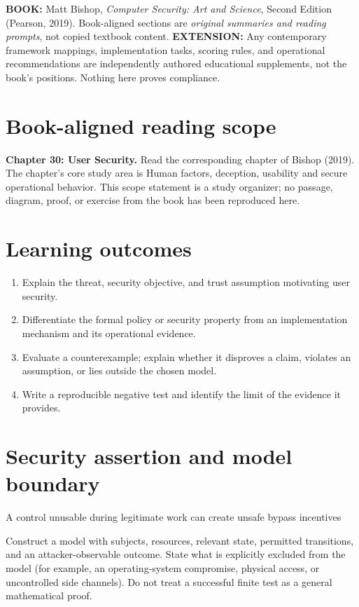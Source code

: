 \documentclass[10pt,letterpaper]{article}
\begin{document}
\makedoctocpage
\begin{notebox}
\textbf{BOOK:} Matt Bishop, \emph{Computer Security: Art and Science}, Second Edition (Pearson, 2019). Book-aligned sections are \emph{original summaries and reading prompts}, not copied textbook content.
\textbf{EXTENSION:} Any contemporary framework mappings, implementation tasks, scoring rules, and operational recommendations are independently authored educational supplements, not the book's positions. Nothing here proves compliance.
\end{notebox}
\section{Book-aligned reading scope}
\textbf{Chapter 30: User Security.} Read the corresponding chapter of Bishop (2019). The chapter's core study area is Human factors, deception, usability and secure operational behavior. This scope statement is a study organizer; no passage, diagram, proof, or exercise from the book has been reproduced here.
\section{Learning outcomes}
\begin{enumerate}
\item Explain the threat, security objective, and trust assumption motivating user security.
\item Differentiate the formal policy or security property from an implementation mechanism and its operational evidence.
\item Evaluate a counterexample; explain whether it disproves a claim, violates an assumption, or lies outside the chosen model.
\item Write a reproducible negative test and identify the limit of the evidence it provides.
\end{enumerate}
\section{Security assertion and model boundary}
\begin{infobox}
A control unusable during legitimate work can create unsafe bypass incentives
\end{infobox}
Construct a model with subjects, resources, relevant state, permitted transitions, and an attacker-observable outcome. State what is explicitly excluded from the model (for example, an operating-system compromise, physical access, or uncontrolled side channels). Do not treat a successful finite test as a general mathematical proof.
\end{document}
